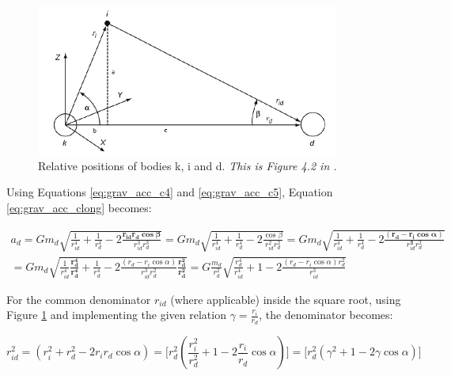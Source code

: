 \begin{figure}[ht]
    \centering
    \includegraphics[width=10cm]{img/grav_acc_c1.jpg}
    \caption{Relative positions of bodies k, i and d. \textit{This is Figure 4.2 in \cite{wakker}.}}
    \label{fig:grav_acc_c1}
\end{figure}

\noindent Using Equations \ref{eq:grav_acc_c4} and \ref{eq:grav_acc_c5}, Equation \ref{eq:grav_acc_clong} becomes:

\begin{multline}
    a_{d} = G m_{d} \sqrt{ \frac{1}{r_{id}^4} + \frac{1}{r_{d}^4} - 2\frac{ \boldsymbol{r_{id} r_{d} \cos{\beta}} }{r_{id}^3 r_{d}^3}} = G m_{d} \sqrt{ \frac{1}{r_{id}^4} + \frac{1}{r_{d}^4} - 2\frac{\cos{\beta}}{r_{id}^2 r_{d}^2}} = G m_{d} \sqrt{\frac{1}{r_{id}^4} + \frac{1}{r_{d}^4} - 2\frac{\boldsymbol{(r_{d}-r_{i}\cos{\alpha})} }{r_{id}^{\boldsymbol{3}} r_{d}^2}} \\
    = G m_{d} \sqrt{\frac{1}{r_{id}^4}\boldsymbol{\frac{r_{d}^4}{r_{d}^4}} + \frac{1}{r_{d}^4} - 2\frac{(r_{d}-r_{i}\cos{\alpha}) }{r_{id}^3 r_{d}^2}\boldsymbol{\frac{r_{d}^2}{r_{d}^2}}} = G \frac{m_{d}}{r_{d}^2} \sqrt{\frac{r_{d}^4}{r_{id}^4} + 1 - 2\frac{(r_{d}-r_{i}\cos{\alpha}) r_{d}^2 }{r_{id}^3}}
    \label{eq:grav_acc_c6}
\end{multline}

\noindent For the common denominator $r_{id}$ (where applicable) inside the square root, using Figure \ref{fig:grav_acc_c1} and implementing the given relation $\gamma = \frac{r_{i}}{r_{d}}$, the denominator becomes:

\begin{equation}
    r_{id}^2 = (r_{i}^2 + r_{d}^2 - 2r_{i}r_{d}\cos{\alpha}) = \bigg[ r_{d}^2(\frac{r_{i}^2}{r_{d}^2} + 1 - 2\frac{r_{i}}{r_{d}}\cos{\alpha}) \bigg] = \bigg[ r_{d}^2(\gamma^2 + 1 - 2 \gamma\cos{\alpha}) \bigg]
    \label{eq:grav_acc_c7}
\end{equation}

